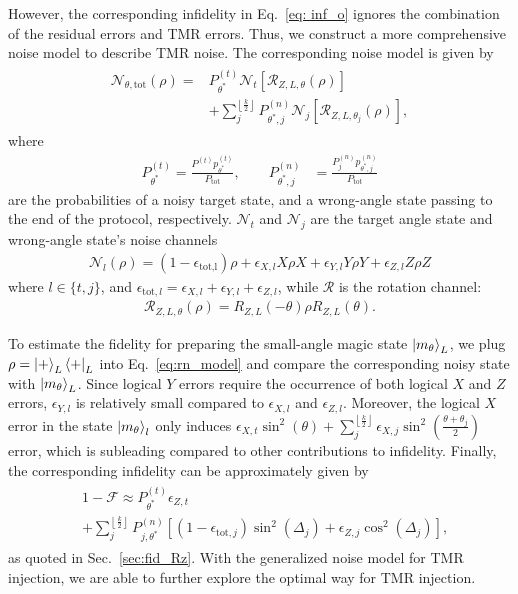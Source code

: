 \documentclass[aps, prx, reprint, superscriptaddress, longbibliography, floatfix]{revtex4-2}
\begin{document}
However, the corresponding infidelity in Eq.~\eqref{eq: inf_o} ignores the combination of the residual errors and TMR errors. Thus, we construct a more comprehensive noise model to describe TMR noise. The corresponding noise model is given by
\begin{align}
\begin{split}
\label{eq:rn_model}
      \mathcal{N}_{\theta,\text{tot}}(\rho)=&P^{(t)}_{\theta^*} \mathcal{N}_{t}\left [ \mathcal{R}_{Z,L,\theta}(\rho) \right ]\\&+\sum_j^{\left \lfloor\frac{k}{2}\right \rfloor} P^{(n)}_{\theta^*,j} \mathcal{N}_{j}\left [ \mathcal{R}_{Z,L,\theta_j}(\rho) \right ],
\end{split}
\end{align}
where
\begin{align}
      P^{(t)}_{\theta^*}=\frac{P^{(t)}p^{(t)}_{\theta^*}}{P_{\text{tot}}}, \qquad      P^{(n)}_{\theta^*,j}&=\frac{P^{(n)}_{j}p^{(n)}_{\theta^*,j}}{P_{\text{tot}}}
\end{align}
 are the probabilities of a noisy target state, and a wrong-angle state passing to the end of the protocol, respectively. $\mathcal{N}_{t}$ and $\mathcal{N}_{j}$ are the target angle state and wrong-angle state's noise channels
\begin{align}
\label{eq:t_model}
      \mathcal{N}_{l}(\rho)=\left ( 1-\epsilon_{\text{tot,l}} \right )\rho+\epsilon_{X,l} X\rho X+\epsilon_{Y,l} Y\rho Y+\epsilon_{Z,l} Z\rho Z  
\end{align}
where $l\in \{t,j\}$, and $\epsilon_{\text{tot},l}=\epsilon_{X,l}+\epsilon_{Y,l}+\epsilon_{Z,l}$, while $\mathcal{R}$ is the rotation channel:
\begin{align}
\label{eq:rot_channel}
      \mathcal{R}_{Z,L,\theta}(\rho) = R_{Z,L}(-\theta)\rho R_{Z,L}(\theta).
\end{align}


To estimate the fidelity for preparing the small-angle magic state $\ket{m_\theta}_L$, we plug $\rho=\ket{+}_L\bra{+}_L$ into Eq.~\eqref{eq:rn_model} and compare the corresponding noisy state with $\ket{m_\theta}_L$. Since logical $Y$ errors require the occurrence of both logical $X$ and $Z$ errors, $\epsilon_{Y,l}$ is relatively small compared to $\epsilon_{X,l}$ and $\epsilon_{Z,l}$. Moreover, the logical $X$ error in the state $\ket{m_\theta}_l$ only induces $\epsilon_{X,t}\sin^2(\theta)+\sum_j^{\left \lfloor\frac{k}{2}\right \rfloor}\epsilon_{X,j}\sin^2(\frac{\theta+\theta_j}{2})$ error, which is subleading compared to other contributions to infidelity. Finally, the corresponding infidelity can be approximately given by 
\begin{align}
\begin{split}
\label{eq:inf_3}
      &1-\mathcal{F}\approx P^{(t)}_{\theta^*} \epsilon_{Z,t}\\&+\sum_j^{\left \lfloor\frac{k}{2}\right \rfloor} P^{(n)}_{j,\theta^*}\left [ (1-\epsilon_{\text{tot},j})\sin^2(\Delta_j)+\epsilon_{Z,j}\cos^2(\Delta_j)\right ],
\end{split}
\end{align}
as quoted in Sec.~\ref{sec:fid_Rz}. With the generalized noise model for TMR injection, we are able to further explore the optimal way for TMR injection.
\end{document}
